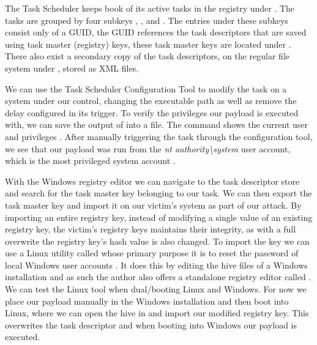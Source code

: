 The Task Scheduler keeps book of its active tasks in the registry under .
The tasks are grouped by four subkeys , ,  and .
The entries under these subkeys consist only of a \ac{GUID}, the \ac{GUID} references the task descriptors that are saved using task master (registry) keys, these task master keys are located under  \cite[Section 10]{windows-internals-7-part2}.
There also exist a secondary copy of the task descriptors, on the regular file system under , stored as \ac{XML} files.

We can use the Task Scheduler Configuration Tool to modify the  task on a system under our control, changing the executable path as well as remove the delay configured in its trigger.
To verify the privileges our payload is executed with, we can save the output of  into a file.
The  command shows the current user and privileges \cite{microsoft-whoami}.
After manually triggering the task through the configuration tool, we see that our payload was run from the \emph{nt authority\textbackslash system} user account, which is the most privileged system account \cite{microsoft-localsystem-account}.


With the Windows registry editor  we can navigate to the task descriptor store and search for the task master key belonging to our task.
We can then export the task master key and import it on our victim's system as part of our attack.
By importing an entire registry key, instead of modifying a single value of an existing registry key, the victim's registry keys maintains their integrity, as with a full overwrite the registry key's hash value is also changed.
To import the key we can use a Linux utility called  whose primary purpose it is to reset the password of local Windows user accounts \cite{chntpw}.
It does this by editing the hive files of a Windows installation and as such the author also offers a standalone registry editor called .
We can test the Linux tool when dual\-/booting Linux and Windows.
For now we place our payload manually in the Windows installation and then boot into Linux, where we can open the  hive in  and import our modified registry key.
This overwrites the task descriptor and when booting into Windows our payload is executed.

